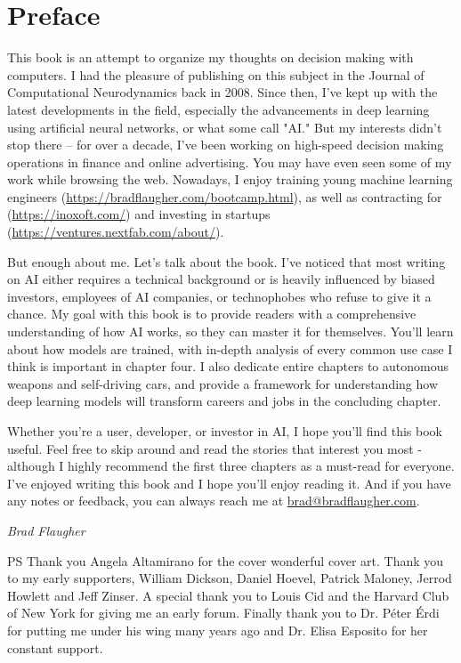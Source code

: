 \chapter*{Preface}

This book is an attempt to organize my thoughts on decision making with computers. I had the pleasure of publishing on this subject in the Journal of Computational Neurodynamics back in 2008. Since then, I've kept up with the latest developments in the field, especially the advancements in deep learning using artificial neural networks, or what some call "AI." But my interests didn't stop there – for over a decade, I've been working on high-speed decision making operations in finance and online advertising. You may have even seen some of my work while browsing the web. Nowadays, I enjoy training young machine learning engineers (\url{https://bradflaugher.com/bootcamp.html}), as well as contracting for (\url{https://inoxoft.com/}) and investing in startups (\url{https://ventures.nextfab.com/about/}).

But enough about me. Let's talk about the book. I've noticed that most writing on AI either requires a technical background or is heavily influenced by biased investors, employees of AI companies, or technophobes who refuse to give it a chance. My goal with this book is to provide readers with a comprehensive understanding of how AI works, so they can master it for themselves. You'll learn about how models are trained, with in-depth analysis of every common use case I think is important in chapter four. I also dedicate entire chapters to autonomous weapons and self-driving cars, and provide a framework for understanding how deep learning models will transform careers and jobs in the concluding chapter.

Whether you're a user, developer, or investor in AI, I hope you'll find this book useful. Feel free to skip around and read the stories that interest you most - although I highly recommend the first three chapters as a must-read for everyone. I've enjoyed writing this book and I hope you'll enjoy reading it. And if you have any notes or feedback, you can always reach me at \href{mailto:brad@bradflaugher.com}{brad@bradflaugher.com}.

\begin{flushright}
	\textit{Brad Flaugher}
\end{flushright}

PS Thank you Angela Altamirano for the cover wonderful cover art. Thank you to my early supporters, William Dickson, Daniel Hoevel, Patrick Maloney, Jerrod Howlett and Jeff Zinser. A special thank you to Louis Cid and the Harvard Club of New York for giving me an early forum. Finally thank you to Dr. Péter Érdi for putting me under his wing many years ago and Dr. Elisa Esposito for her constant support. 


